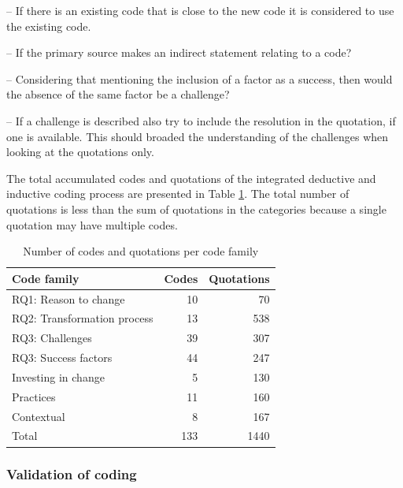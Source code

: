 \documentclass[preprint,authoryear,12pt]{elsarticle}
\begin{document}
-- If there is an existing code that is close to the new code it is considered
   to use the existing code.

-- If the primary source makes an indirect statement relating to a code?



-- Considering that mentioning the inclusion of a factor as a success, then
   would the absence of the same factor be a challenge?

-- If a challenge is described also try to include the resolution in the
   quotation, if one is available. This should broaded the understanding of the
   challenges when looking at the quotations only.

The total accumulated codes and quotations of the integrated deductive and
inductive coding process are presented in Table \ref{table:codecount}. The total
number of quotations is less than the sum of quotations in the categories
because a single quotation may have multiple codes.

\begin{table}[h]
    \begin{tabular}{ l r r }
        \toprule
        Code family    &  Codes  &  Quotations
        \\
        \midrule
        RQ1: Reason to change &        10 &   70 \\
		RQ2: Transformation process &  13 &  538 \\
		RQ3: Challenges &              39 &  307 \\
		RQ3: Success factors &         44 &  247 \\
		Investing in change  &          5 &  130 \\
		Practices &                    11 &  160 \\
		Contextual &                    8 &  167 \\
		Total &                       133 & 1440 \\
        \bottomrule
    \end{tabular}
    \caption{Number of codes and quotations per code family}
    \label{table:codecount}
\end{table}


\subsubsection{Validation of coding}
\end{document}
